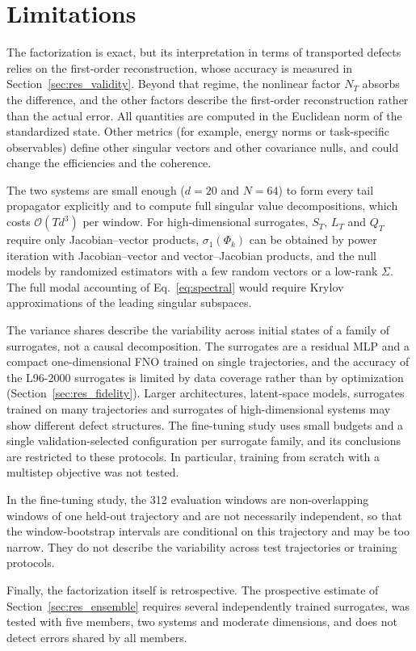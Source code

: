 \section{Limitations}
\label{sec:limitations}

The factorization is exact, but its interpretation in terms of transported defects relies on the first-order reconstruction, whose accuracy is measured in Section~\ref{sec:res_validity}. Beyond that regime, the nonlinear factor $N_T$ absorbs the difference, and the other factors describe the first-order reconstruction rather than the actual error. All quantities are computed in the Euclidean norm of the standardized state. Other metrics (for example, energy norms or task-specific observables) define other singular vectors and other covariance nulls, and could change the efficiencies and the coherence.

The two systems are small enough ($d=20$ and $N=64$) to form every tail propagator explicitly and to compute full singular value decompositions, which costs $\mathcal O(Td^3)$ per window. For high-dimensional surrogates, $S_T$, $L_T$ and $Q_T$ require only Jacobian--vector products, $\sigma_1(\Phi_k)$ can be obtained by power iteration with Jacobian--vector and vector--Jacobian products, and the null models by randomized estimators with a few random vectors or a low-rank $\Sigma$. The full modal accounting of Eq.~\eqref{eq:spectral} would require Krylov approximations of the leading singular subspaces.

The variance shares describe the variability across initial states of a family of surrogates, not a causal decomposition. The surrogates are a residual MLP and a compact one-dimensional FNO trained on single trajectories, and the accuracy of the L96-2000 surrogates is limited by data coverage rather than by optimization (Section~\ref{sec:res_fidelity}). Larger architectures, latent-space models, surrogates trained on many trajectories and surrogates of high-dimensional systems may show different defect structures. The fine-tuning study uses small budgets and a single validation-selected configuration per surrogate family, and its conclusions are restricted to these protocols. In particular, training from scratch with a multistep objective was not tested.

In the fine-tuning study, the 312 evaluation windows are non-overlapping windows of one held-out trajectory and are not necessarily independent, so that the window-bootstrap intervals are conditional on this trajectory and may be too narrow. They do not describe the variability across test trajectories or training protocols.

Finally, the factorization itself is retrospective. The prospective estimate of Section~\ref{sec:res_ensemble} requires several independently trained surrogates, was tested with five members, two systems and moderate dimensions, and does not detect errors shared by all members.
